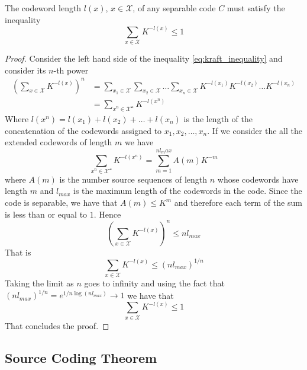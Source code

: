 \begin{theorem}\label{thm:kraft_inequality}
    The codeword length $l(x)$, $x \in \mathcal{X}$, of any separable code $C$ must satisfy the inequality
    \begin{equation}\label{eq:kraft_inequality}
        \sum_{x\in\mathcal{X}} K^{-l(x)} \leq 1
    \end{equation}
\end{theorem}
\begin{proof}
    Consider the left hand side of the inequality \ref{eq:kraft_inequality} and consider its $n$-th power
    \begin{align}
        \left( \sum_{x\in\mathcal{X}} K^{-l(x)} \right)^n & = \sum_{x_1\in\mathcal{X}} \sum_{x_2\in\mathcal{X}} \ldots \sum_{x_n\in\mathcal{X}} K^{-l(x_1)} K^{-l(x_2)} \ldots K^{-l(x_n)} \nonumber \\
                                                          & = \sum_{x^n \in\mathcal{X^n}} K^{-l(x^n)}
    \end{align}
    Where $l(x^n) = l(x_1) + l(x_2) + \ldots + l(x_n)$ is the length of the concatenation of the codewords assigned to $x_1, x_2, \ldots, x_n$. If we consider the all the extended codewords of length $m$ we have
    \begin{equation}
        \sum_{x^n \in\mathcal{X^n}} K^{-l(x^n)} = \sum_{m=1}^{n l_max} A(m) K^{-m}
    \end{equation}
    where $A(m)$ is the number source sequences of length $n$ whose codewords have length $m$ and $l_{max}$ is the maximum length of the codewords in the code. Since the code is separable, we have that $A(m) \leq K^m$ and therefore each term of the sum is less than or equal to $1$. Hence
    \begin{equation}
        \left( \sum_{x\in\mathcal{X}} K^{-l(x)} \right)^n \leq n l_{max}
    \end{equation}
    That is
    \begin{equation}
        \sum_{x\in\mathcal{X}} K^{-l(x)} \leq (n l_{max})^{1/n}
    \end{equation}
    Taking the limit as $n$ goes to infinity and using the fact that $(n l_{max})^{1/n} = e^{1/n \log (n l_{max})} \to 1$ we have that
    \begin{equation}
        \sum_{x\in\mathcal{X}} K^{-l(x)} \leq 1
    \end{equation}
    That concludes the proof.
\end{proof}

\subsection{Source Coding Theorem}

